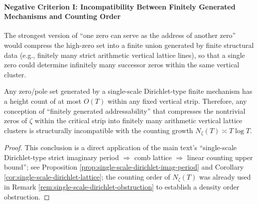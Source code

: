 \paragraph{Negative Criterion I: Incompatibility Between Finitely Generated Mechanisms and Counting Order}
The strongest version of ``one zero can serve as the address of another zero'' would compress the high-zero set into a finite union generated by finite structural data (e.g., finitely many strict arithmetic vertical lattice lines), so that a single zero could determine infinitely many successor zeros within the same vertical cluster.
\begin{proposition}\label{prop:xi-addressability-counting-obstruction}
Any zero/pole set generated by a single-scale Dirichlet-type finite mechanism has a height count of at most \(O(T)\) within any fixed vertical strip.
Therefore, any conception of ``finitely generated addressability'' that compresses the nontrivial zeros of \(\zeta\) within the critical strip into finitely many arithmetic vertical lattice clusters is structurally incompatible with the counting growth \(N_\zeta(T)\asymp T\log T\).
\end{proposition}
\begin{proof}
This conclusion is a direct application of the main text's ``single-scale Dirichlet-type strict imaginary period \(\Rightarrow\) comb lattice \(\Rightarrow\) linear counting upper bound''; see Proposition \ref{prop:single-scale-dirichlet-imag-period} and Corollary \ref{cor:single-scale-dirichlet-lattice}; the counting order of \(N_\zeta(T)\) was already used in Remark \ref{rem:single-scale-dirichlet-obstruction} to establish a density order obstruction. \qedhere
\end{proof}

